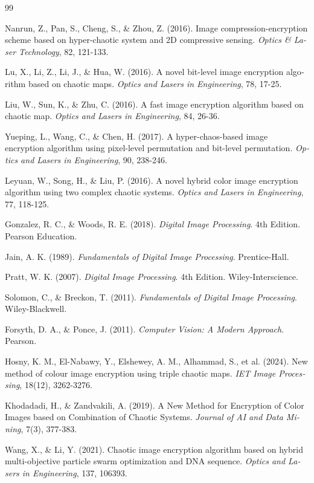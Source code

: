 \begin{thebibliography}{99}
\begin{LTRbibitems}
\begin{latin}
 Nanrun, Z., Pan, S., Cheng, S., \& Zhou, Z. (2016). Image compression-encryption scheme based on hyper-chaotic system and 2D compressive sensing. \textit{Optics \& Laser Technology}, 82, 121-133.

 Lu, X., Li, Z., Li, J., \& Hua, W. (2016). A novel bit-level image encryption algorithm based on chaotic maps. \textit{Optics and Lasers in Engineering}, 78, 17-25.

 Liu, W., Sun, K., \& Zhu, C. (2016). A fast image encryption algorithm based on chaotic map. \textit{Optics and Lasers in Engineering}, 84, 26-36.

 Yueping, L., Wang, C., \& Chen, H. (2017). A hyper-chaos-based image encryption algorithm using pixel-level permutation and bit-level permutation. \textit{Optics and Lasers in Engineering}, 90, 238-246.

 Leyuan, W., Song, H., \& Liu, P. (2016). A novel hybrid color image encryption algorithm using two complex chaotic systems. \textit{Optics and Lasers in Engineering}, 77, 118-125.

 Gonzalez, R. C., \& Woods, R. E. (2018). \textit{Digital Image Processing}. 4th Edition. Pearson Education.

 Jain, A. K. (1989). \textit{Fundamentals of Digital Image Processing}. Prentice-Hall.

 Pratt, W. K. (2007). \textit{Digital Image Processing}. 4th Edition. Wiley-Interscience.

 Solomon, C., \& Breckon, T. (2011). \textit{Fundamentals of Digital Image Processing}. Wiley-Blackwell.

 Forsyth, D. A., \& Ponce, J. (2011). \textit{Computer Vision: A Modern Approach}. Pearson.

 Hosny, K. M., El-Nabawy, Y., Elshewey, A. M., Alhammad, S., et al. (2024). New method of colour image encryption using triple chaotic maps. \textit{IET Image Processing}, 18(12), 3262-3276.

 Khodadadi, H., \& Zandvakili, A. (2019). A New Method for Encryption of Color Images based on Combination of Chaotic Systems. \textit{Journal of AI and Data Mining}, 7(3), 377-383.

 Wang, X., \& Li, Y. (2021). Chaotic image encryption algorithm based on hybrid multi-objective particle swarm optimization and DNA sequence. \textit{Optics and Lasers in Engineering}, 137, 106393.


\end{latin}
\end{LTRbibitems}
\end{thebibliography}
